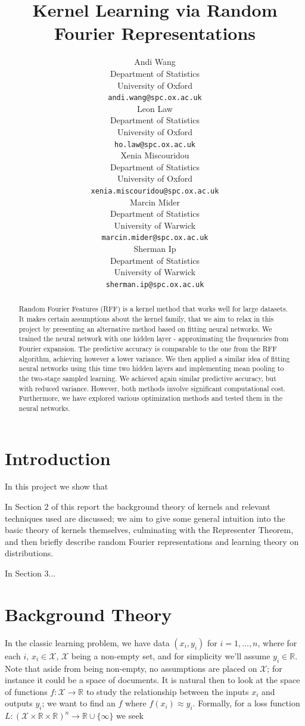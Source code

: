 \documentclass{article} %
\title{Kernel Learning via Random Fourier Representations}
\author{
Andi Wang\\
Department of Statistics\\
University of Oxford\\
\texttt{andi.wang@spc.ox.ac.uk} \\
\And
Leon Law \\
Department of Statistics \\
University of Oxford \\
\texttt{ho.law@spc.ox.ac.uk} \\
\AND
Xenia Miscouridou \\
Department of Statistics \\
University of Oxford \\
\texttt{xenia.miscouridou@spc.ox.ac.uk} \\
\And
Marcin Mider \\
Department of Statistics \\
University of Warwick\\
\texttt{marcin.mider@spc.ox.ac.uk} \\
\And
Sherman Ip \\
Department of Statistics \\
University of Warwick \\
\texttt{sherman.ip@spc.ox.ac.uk} \\
}
\begin{document}
\maketitle

\begin{abstract}
Random Fourier Features (RFF) is a kernel method that works well for large datasets. It makes certain assumptions about the kernel family, that we aim to relax in this project by presenting an alternative method based on fitting neural networks. We trained the neural network with one hidden layer - approximating the frequencies from Fourier expansion. The predictive accuracy is comparable to the one from the RFF algorithm, achieving however a lower variance. We then applied a similar idea of fitting neural networks using this time two hidden layers and implementing mean pooling to the two-stage sampled learning. We achieved again similar predictive accuracy, but with reduced variance. However,  both methods involve significant computational cost. Furthermore, we have explored various optimization methods and tested them in the neural networks.
\end{abstract}



\section{Introduction}

In this project we show that 

In Section 2 of this report the background theory of kernels and relevant techniques used are discussed; we aim to give some general intuition into the basic theory of kernels themselves, culminating with the Representer Theorem, and then briefly describe random Fourier representations and learning theory on distributions.

In Section 3...


\section{Background Theory}

In the classic learning problem, we have data $(x_i,y_i)$ for $i=1,\dots,n$, where for each $i$, $x_i \in \mathcal{X}$, $\mathcal{X}$ being a non-empty set, and for simplicity we'll assume $y_i \in \mathbb{R}$. Note that aside from being non-empty, no assumptions are placed on $\mathcal{X}$; for instance it could be a space of documents. It is natural then to look at the space of functions $f: \mathcal{X}\rightarrow \mathbb{R}$ to study the relationship between the inputs $x_i$ and outputs $y_i$; we want to find an $f$ where $f(x_i)\approx y_i$. Formally, for a loss function $L: (\mathcal{X}\times\mathbb{R}\times\mathbb{R})^n \rightarrow \mathbb{R} \cup \{\infty\}$ we seek 
\end{document}
